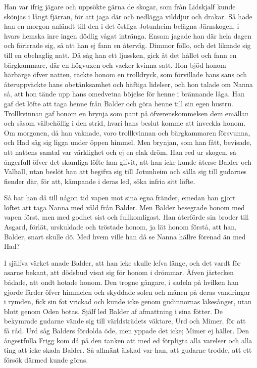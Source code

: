 Han var ifrig jägare och uppsökte gärna de skogar, som från Lidskjalf
kunde skönjas i långt fjärran, för att jaga där och nedlägga vilddjur
och drakar. Så hade han en morgon anländt till den i det östliga
Jotunheim belägna Järnskogen, i hvars hemska inre ingen dödlig vågat
intränga. Ensam jagade han där hela dagen och förirrade sig, så att han
ej fann en återväg. Dimmor föllo, och det liknade sig till en obehaglig
natt. Då såg han ett ljussken, gick åt det hållet och fann en
bärgkammare, där en högvuxen och vacker kvinna satt. Hon bjöd honom
härbärge öfver natten, räckte honom en trolldryck, som förvillade hans
sans och återuppväckte hans obetänksamhet och häftiga lidelser, och hon
talade om Nanna så, att hon tände upp hans omedvetna böjelse för henne i
brännande låga. Han gaf det löfte att taga henne från Balder och göra
henne till sin egen hustru. Trollkvinnan gaf honom en brynja som pant på
öfverenskommelsen dem emällan och såsom välbehöflig i den strid, hvari
hans beslut komme att inveckla honom. Om morgonen, då han vaknade, voro
trollkvinnan och bärgkammaren försvunna, och Had såg sig ligga under
öppen himmel. Men brynjan, som han fått, bevisade, att nattens samtal
var värklighet och ej en elak dröm. Han red ur skogen, så ångerfull
öfver det skamliga löfte han gifvit, att han icke kunde återse Balder
och Valhall, utan beslöt han att begifva sig till Jotunheim och sälla
sig till gudarnes fiender där, för att, kämpande i deras led, söka
infria sitt löfte.

Så bar han då till någon tid vapen mot sina egna fränder,
\protect\hypertarget{lb1625905.xhtmlux5cux23start86}{}{}\protect\hypertarget{lb1625905.xhtmlux5cux23start86-a}{}{}\protect\hypertarget{lb1625905.xhtmlux5cux23start86-b}{}{}\protect\hypertarget{lb1625905.xhtmlux5cux23start86-c}{}{}\protect\hypertarget{lb1625905.xhtmlux5cux23start86-d}{}{}
emedan han gjort löftet att taga Nanna med våld från Balder. Men Balder
besegrade honom med vapen först, men med godhet sist och fullkomligast.
Han återförde sin broder till Asgard, förlät, urskuldade och tröstade
honom, ja lät honom förstå, att han, Balder, snart skulle dö. Med hvem
ville han då se Nanna hällre förenad än med Had?

I själfva värket anade Balder, att han icke skulle lefva länge, och det
vardt för asarne bekant, att dödsbud visat sig för honom i drömmar.
Äfven järtecken bådade, att ondt hotade honom. Den trogne gångare, i
sadeln på hvilken han gjorde färder öfver himmelen och skyddade solen
och månen på deras vandringar i rymden, fick sin fot vrickad och kunde
icke genom gudinnornas läkesånger, utan blott genom Oden botas. Själf
led Balder af afmattning i sina fötter. De bekymrade gudarne vände sig
till världsträdets väktare, Urd och Mimer, för att få råd. Urd såg
Balders fördolda öde, men yppade det icke; Mimer ej häller. Den
ångestfulla Frigg kom då på den tanken att med ed förpligta alla
varelser och alla ting att icke skada Balder. Så allmänt älskad var han,
att gudarne trodde, att ett försök därmed kunde göras.

